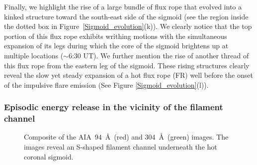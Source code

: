 \documentclass[twocolumn]{aastex6}
\begin{document}
Finally, we highlight the rise of a large bundle of flux rope that evolved into a kinked structure toward the south-east side of the sigmoid (see the region inside the dotted box in Figure~\ref{Sigmoid_evolution}(k)). 
We clearly notice that the top portion of this flux rope exhibits writhing motions with the simultaneous expansion of its legs during which the core of the sigmoid brightens up at multiple locations ($\sim$6:30 UT). We further mention the rise of another thread of this flux rope from the eastern leg of the sigmoid. These rising structures clearly reveal the slow yet steady expansion of a hot flux rope (FR) well before the onset of the impulsive flare emission (See Figure \ref{Sigmoid_evolution}(l)).                

\subsubsection{Episodic energy release in the vicinity of the filament channel}
\label{sec_Episodic_release}

\begin{figure}
\caption{Composite of the AIA~94~\AA~(red) and 304~\AA~(green) images. The images reveal an S-shaped filament channel underneath the hot coronal sigmoid. }
\label{aia_composite}
\end{figure}
\end{document}
